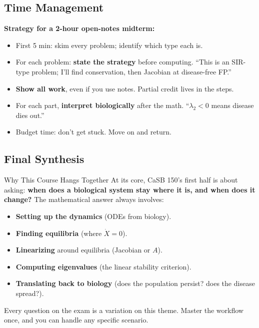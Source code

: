 \documentclass[11pt]{article}
\begin{document}
\subsection{Time Management}

\begin{tipbox}
\textbf{Strategy for a 2-hour open-notes midterm:}
\begin{itemize}
\item First 5 min: skim every problem; identify which type each is.
\item For each problem: \textbf{state the strategy} before computing. ``This is an SIR-type problem; I'll find conservation, then Jacobian at disease-free FP.''
\item \textbf{Show all work}, even if you use notes. Partial credit lives in the steps.
\item For each part, \textbf{interpret biologically} after the math. ``$\lambda_2 < 0$ means disease dies out.''
\item Budget time: don't get stuck. Move on and return.
\end{itemize}
\end{tipbox}

\subsection{Final Synthesis}

\begin{conceptbox}{Why This Course Hangs Together}
At its core, CaSB 150's first half is about asking: \textbf{when does a biological system stay where it is, and when does it change?} The mathematical answer always involves:
\begin{itemize}
\item \textbf{Setting up the dynamics} (ODEs from biology).
\item \textbf{Finding equilibria} (where $\dot X = 0$).
\item \textbf{Linearizing} around equilibria (Jacobian or $A$).
\item \textbf{Computing eigenvalues} (the linear stability criterion).
\item \textbf{Translating back to biology} (does the population persist? does the disease spread?).
\end{itemize}
Every question on the exam is a variation on this theme. Master the workflow once, and you can handle any specific scenario.
\end{conceptbox}
\end{document}
